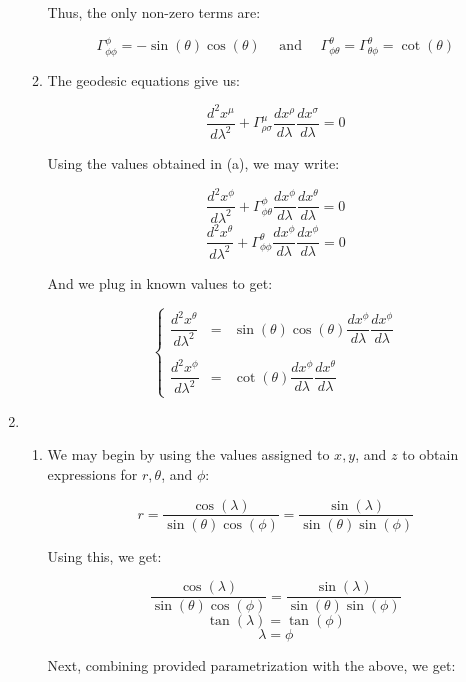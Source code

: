 \begin{enumerate}
\begin{enumerate}
          Thus, the only non-zero terms are:

          $$\boxed{\Gamma_{\phi\phi}^{\phi}=-\sin(\theta)\cos(\theta)\quad\text{ and }\quad\Gamma^{\theta}_{\phi\theta}=\Gamma^{\theta}_{\theta\phi}=\cot(\theta)}$$

      \item 

        The geodesic equations give us:

        $$\frac{d^2x^{\mu}}{d\lambda^2}+\Gamma^{\mu}_{\rho\sigma}\frac{dx^{\rho}}{d\lambda}\frac{dx^{\sigma}}{d\lambda}=0$$

        Using the values obtained in (a), we may write:

        $$\frac{d^2x^{\phi}}{d\lambda^2}+\Gamma^{\phi}_{\phi\theta}\frac{dx^{\phi}}{d\lambda}\frac{dx^{\theta}}{d\lambda}=0$$
        $$\frac{d^2x^{\theta}}{d\lambda^2}+\Gamma^{\theta}_{\phi\phi}\frac{dx^{\phi}}{d\lambda}\frac{dx^{\phi}}{d\lambda}=0$$

        And we plug in known values to get:

        $$\boxed{\left\{\begin{array}{lll} \dfrac{d^2x^{\theta}}{d\lambda^2} &= &\sin(\theta)\cos(\theta)\dfrac{dx^{\phi}}{d\lambda}\dfrac{dx^{\phi}}{d\lambda}\\\\ \dfrac{d^2x^{\phi}}{d\lambda^2} &= &\cot(\theta)\dfrac{dx^{\phi}}{d\lambda}\dfrac{dx^{\theta}}{d\lambda}\end{array}}$$

    \end{enumerate}

  \item

    \begin{enumerate}

      \item 

        We may begin by using the values assigned to $x,y$, and $z$ to obtain expressions for $r,\theta$, and $\phi$:

        $$r=\frac{\cos(\lambda)}{\sin(\theta)\cos(\phi)}=\frac{\sin(\lambda)}{\sin(\theta)\sin(\phi)}$$

        Using this, we get:

        $$\frac{\cos(\lambda)}{\sin(\theta)\cos(\phi)}=\frac{\sin(\lambda)}{\sin(\theta)\sin(\phi)}$$
        $$\tan(\lambda)=\tan(\phi)$$
        $$\lambda=\phi$$

        Next, combining provided parametrization with the above, we get:


\end{enumerate}
\end{enumerate}
